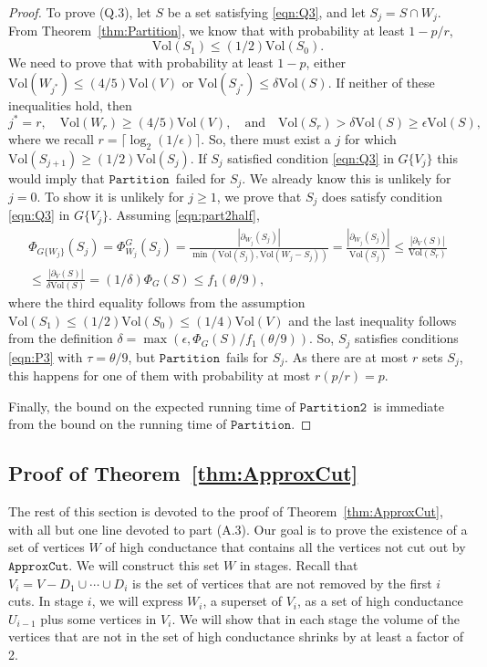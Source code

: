 \documentclass[11pt]{article}
\newcommand{\approxcut}{\ensuremath{\mathtt{ApproxCut}}}
\newcommand{\partition}{\ensuremath{\mathtt{Partition}}}
\newcommand{\partitiontwo}{\ensuremath{\mathtt{Partition2}}}
\def\bdry#1#2{\partial_{#1}\left(#2\right)}
\def\union{\cup}
\def\intersect{\cap}
\def\sizeof#1{\left|#1  \right|}
\def\intersect{\cap}
\newcommand{\ceiling}[1]{\lceil#1\rceil}
\def\vol#1{\mathrm{Vol}\left(#1  \right)}
\def\conduc#1#2{\Phi_{#1}\left(#2  \right)}
\def\conducin#1#2{\Phi^{G}_{#1}\left(#2  \right)}
\begin{document}
\begin{proof}
To prove (Q.3),
  let $S$ be a set satisfying \eqref{eqn:Q3}, and
  let $S_{j} = S \intersect W_{j}$.
From Theorem~\ref{thm:Partition}, we know that with probability at least
  $1 - p/r$,
\begin{equation}\label{eqn:part2half}
 \vol{S_{1}} \leq (1/2) \vol{S_{0}}.
\end{equation}
We need to prove that with probability at least $1-p$,
  either $\vol{W_{j^{*}}} \leq (4/5) \vol{V}$
  or
  $\vol{S_{j^{*}}} \leq \delta \vol{S}$.
If neither of these inequalities hold, then
\[
  j^{*} = r,
\quad \vol{W_{r}} \geq (4/5) \vol{V},
\quad \text{and} \quad \vol{S_{r}} > \delta \vol{S} \geq  \epsilon \vol{S},
\]
where we recall $r = \ceiling{\log_{2} (1/\epsilon )}$.
So, there must exist a $j$ for which $\vol{S_{j+1}} \geq (1/2) \vol{S_{j}}$.
If $S_{j}$ satisfied condition \eqref{eqn:Q3} 
  in $G\{V_{j} \}$ this would imply that
  \partition \ failed for $S_{j}$.
We already know this is unlikely for $j=0$.
To show it is unlikely for $j \geq 1$, we prove that $S_{j}$ does
  satisfy condition \eqref{eqn:Q3} 
  in $G\{V_{j}\}$.
Assuming \eqref{eqn:part2half},
\begin{multline*}
\conduc{G\{W_{j} \}}{S_{j}}
=
\conducin{W_{j}}{S_{j}}
=
\frac{
  \sizeof{\bdry{W_{j}}{S_{j}}}
}{
  \min \left(\vol{S_{j}}, \vol{W_{j} - S_{j}} \right)
}
=
\frac{
  \sizeof{\bdry{W_{j}}{S_{j}}}
}{
  \vol{S_{j}}
}
\leq
\frac{
  \sizeof{\bdry{V}{S}}
}{
  \vol{S_{r}}
}\\
\leq
\frac{
  \sizeof{\bdry{V}{S}}
}{
  \delta \vol{S}
}
=
(1/\delta)\conduc{G}{S}
\leq
f_{1} (\theta/9),
\end{multline*}
where the third equality follows from the assumption 
  $\vol{S_{1}} \leq (1/2) \vol{S_{0}} \leq (1/4) \vol{V}$ and the last
  inequality follows from the definition
  $\delta = \max \left(\epsilon ,   \conduc{G}{S}/ f_{1} (\theta/9) \right)$.
So, $S_{j}$ satisfies conditions \eqref{eqn:P3} 
  with $\tau = \theta/9$, but \partition \ fails for $S_{j}$.
As there are at most $r$ sets $S_{j}$, this happens for one of them with probability at most
  $r (p/r) = p$.

Finally, the bound on the expected running time of \partitiontwo \
  is immediate from the bound on the running time of \partition.
\end{proof}

\subsection{Proof of Theorem~\ref{thm:ApproxCut}}
The rest of this section is devoted to the proof of Theorem~\ref{thm:ApproxCut}, with all but one
  line devoted to part (A.3).
Our goal is to prove the existence of a set of vertices $W$ of high conductance
  that contains all the vertices not cut out by \approxcut .
We will construct this set $W$ in stages.
Recall that $V_{i} = V - D_{1} \union \dotsb \union D_{i}$ is the set of vertices
  that are not removed by the first $i$ cuts.
In stage $i$, we will express $W_{i}$, a superset of $V_{i}$, as a set of high
  conductance $U_{i-1}$ plus some vertices in $V_{i}$.
We will show that in each stage the volume of the vertices that are
  not in the set of high conductance shrinks by at least a factor of 2.
\end{document}
